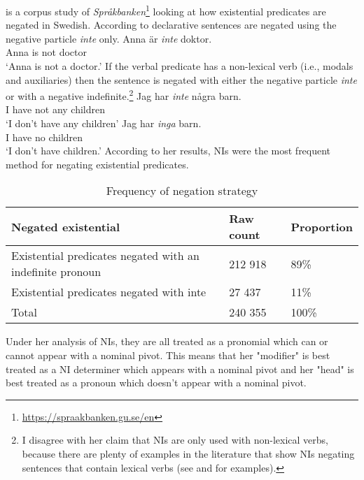 \documentclass[12pt, letterpaper]{article}
\begin{document}
\ea \citet{valentinebordalNegationExistentialPredications2017} is a corpus study of \textit{Språkbanken}\footnote{\url{https://spraakbanken.gu.se/en}} looking at how existential predicates are negated in Swedish.
\ex According to \citeauthor{valentinebordalNegationExistentialPredications2017} declarative sentences are negated using the negative particle \textit{inte} only. 
	\ea
	\gll Anna är \textit{inte} doktor.\\
	Anna is not doctor\\
	\glt `Anna is not a doctor.'
	\z 
\ex If the verbal predicate has a non-lexical verb (i.e., modals and auxiliaries) then the sentence is negated with either the negative particle \textit{inte} or with a negative indefinite.\footnote{I disagree with her claim that NIs are only used with non-lexical verbs, because there are plenty of examples in the literature that show NIs negating sentences that contain lexical verbs (see \cite{engelsScandinavianNegativeIndefinites2012} and \cite{christensenInterfacesNegationSyntax2005} for examples).} 
	\ea
	\gll Jag har \textit{inte} några barn.\\
	I have not any children\\
	\glt `I don't have any children'
	\ex 
	\gll Jag har \textit{inga} barn.\\
	I have no children\\
	\glt `I don't have children.'
	\z 
\ex According to her results, NIs were the most frequent method for negating existential predicates. 
	
	\begin{table}[h!]
	\centering
	\caption{Frequency of negation strategy}
	\begin{tabular}{lll}
	\hline
	Negated existential & Raw count & Proportion\\
	\hline
	Existential predicates negated with an indefinite pronoun & 212 918 & 89\% \\
	Existential predicates negated with inte & 27 437 & 11\% \\
	\hline
	Total & 240 355 & 100\%  \\
	\hline
	\end{tabular}
	\end{table}

\ex Under her analysis of NIs, they are all treated as a pronomial which can or cannot appear with a nominal pivot.
	\ea This means that her "modifier" is best treated as a NI determiner which appears with a nominal pivot and her "head" is best treated as a pronoun which doesn't appear with a nominal pivot.
	\z 
\end{document}

